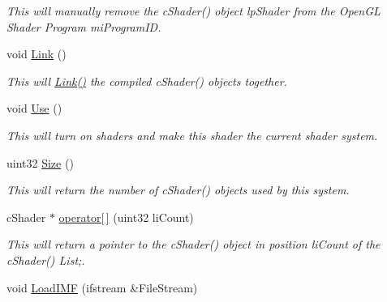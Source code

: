 \begin{DoxyCompactItemize}
\begin{DoxyCompactList}\small\item\em This will manually remove the cShader() object lpShader from the OpenGL Shader Program miProgramID. \end{DoxyCompactList}\item 
\hypertarget{classc_shader_program_a2e6bc46c158959bcea66b4e321416b72}{
void \hyperlink{classc_shader_program_a2e6bc46c158959bcea66b4e321416b72}{Link} ()}
\label{classc_shader_program_a2e6bc46c158959bcea66b4e321416b72}

\begin{DoxyCompactList}\small\item\em This will \hyperlink{classc_shader_program_a2e6bc46c158959bcea66b4e321416b72}{Link()} the compiled cShader() objects together. \end{DoxyCompactList}\item 
\hypertarget{classc_shader_program_a875d9dca579f3b2ea1d81b65faf80738}{
void \hyperlink{classc_shader_program_a875d9dca579f3b2ea1d81b65faf80738}{Use} ()}
\label{classc_shader_program_a875d9dca579f3b2ea1d81b65faf80738}

\begin{DoxyCompactList}\small\item\em This will turn on shaders and make this shader the current shader system. \end{DoxyCompactList}\item 
\hypertarget{classc_shader_program_a1f3e7bf1c63c0bde8e537981ed555933}{
uint32 \hyperlink{classc_shader_program_a1f3e7bf1c63c0bde8e537981ed555933}{Size} ()}
\label{classc_shader_program_a1f3e7bf1c63c0bde8e537981ed555933}

\begin{DoxyCompactList}\small\item\em This will return the number of cShader() objects used by this system. \end{DoxyCompactList}\item 
\hypertarget{classc_shader_program_a1a75e17e0116f72f0079c6097f66ac22}{
cShader $\ast$ \hyperlink{classc_shader_program_a1a75e17e0116f72f0079c6097f66ac22}{operator\mbox{[}$\,$\mbox{]}} (uint32 liCount)}
\label{classc_shader_program_a1a75e17e0116f72f0079c6097f66ac22}

\begin{DoxyCompactList}\small\item\em This will return a pointer to the cShader() object in position liCount of the cShader() List;. \end{DoxyCompactList}\item 
\hypertarget{classc_shader_program_ac8f1caa093d9651daf5e303e877ed47d}{
void \hyperlink{classc_shader_program_ac8f1caa093d9651daf5e303e877ed47d}{LoadIMF} (ifstream \&FileStream)}
\label{classc_shader_program_ac8f1caa093d9651daf5e303e877ed47d}


\end{DoxyCompactItemize}
